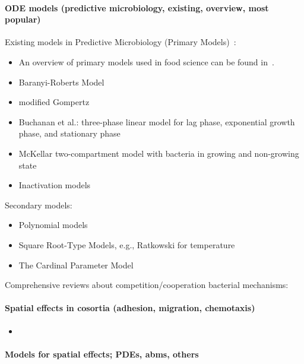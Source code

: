 \documentclass[10pt,A4paper]{article}
\numberwithin{equation}{section}
\begin{document}
\paragraph{ODE models (predictive microbiology, existing, overview, most popular)}
Existing models in Predictive Microbiology (Primary Models)~\cite{perez-rodriguez_predictive_2012}:
\begin{itemize}
    \item An overview of primary models used in food science can be found in~\cite{van_boekel_kinetic_2008}.
    \item Baranyi-Roberts Model~\cite{baranyi_modeling_1993, baranyi_dynamic_1994}
    \item modified Gompertz
    \item Buchanan et al.: three-phase linear model for lag phase, exponential growth phase, and stationary phase~\cite{buchanan_when_1997}
    \item McKellar two-compartment model with bacteria in growing and non-growing state~\cite{mckellar_heterogeneous_1997}
    \item Inactivation models
\end{itemize}
%
Secondary models:
\begin{itemize}
    \item Polynomial models 
    \item Square Root-Type Models, e.g., Ratkowski for temperature~\cite{ratkowsky_relationship_1982}
    \item The Cardinal Parameter Model~\cite{zwietering_decision_1992}
\end{itemize}
%
%
Comprehensive reviews about competition/cooperation bacterial mechanisms: \cite{ghoul_ecology_2016, stubbendieck_bacterial_2016, hibbing_bacterial_2010, west_social_2007}\\

\noindent
\paragraph{Spatial effects in cosortia (adhesion, migration, chemotaxis)}
\begin{itemize}
    \item 
\end{itemize}

\noindent
\paragraph{Models for spatial effects; PDEs, \acp{abm}, others}
%
%
%
\end{document}
